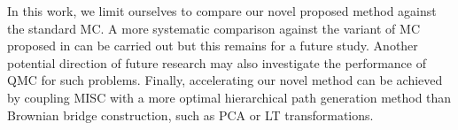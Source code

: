 In this work, we limit ourselves to compare our novel proposed method against the standard MC. A more systematic comparison against the variant of MC proposed in \cite{mccrickerd2018turbocharging}  can be carried out but this remains for a future study. Another  potential direction of future  research may also investigate the performance of QMC for such problems. Finally, accelerating  our novel  method can be achieved  by coupling MISC with a more optimal hierarchical path generation method than Brownian bridge construction, such as PCA or LT transformations.